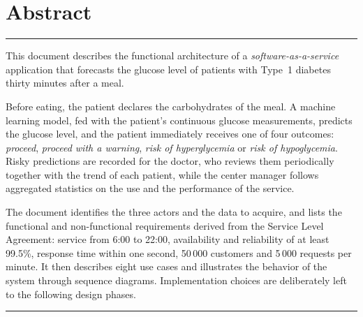 \chapter*{Abstract}
\thispagestyle{plain}

\begin{list}{}{%
    \setlength{\leftmargin}{1.5cm}%
    \setlength{\rightmargin}{1.5cm}%
    \setlength{\itemsep}{0pt}%
    \setlength{\parsep}{0.8em}%
    \setlength{\topsep}{0pt}}
\item[]
{\color{accent}\rule{\linewidth}{0.8pt}}

\vspace{0.6em}
This document describes the functional architecture of a
\emph{software-as-a-service} application that forecasts the glucose level of
patients with Type~1 diabetes thirty minutes after a meal.

Before eating, the patient declares the carbohydrates of the meal. A machine
learning model, fed with the patient's continuous glucose measurements,
predicts the glucose level, and the patient immediately receives one of four
outcomes: \emph{proceed}, \emph{proceed with a warning}, \emph{risk of
hyperglycemia} or \emph{risk of hypoglycemia}. Risky predictions are recorded
for the doctor, who reviews them periodically together with the trend of each
patient, while the center manager follows aggregated statistics on the use and
the performance of the service.

The document identifies the three actors and the data to acquire, and lists the
functional and non-functional requirements derived from the Service Level
Agreement: service from 6:00 to 22:00, availability and reliability of at least
99.5\%, response time within one second, 50\,000 customers and 5\,000 requests
per minute. It then describes eight use cases and illustrates the behavior of
the system through sequence diagrams. Implementation choices are deliberately
left to the following design phases.

\vspace{0.4em}
{\color{accent}\rule{\linewidth}{0.8pt}}

\vspace{0.2em}


\end{list}